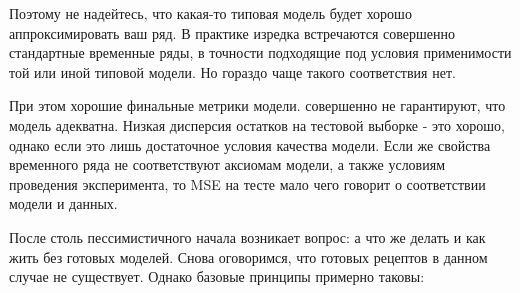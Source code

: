 Поэтому не надейтесь, что какая-то типовая модель будет хорошо
аппроксимировать ваш ряд. В практике изредка встречаются совершенно стандартные
временные ряды, в точности подходящие под условия применимости той
или иной типовой модели. Но гораздо чаще такого соответствия нет.

При этом хорошие финальные метрики модели. совершенно не гарантируют,
что модель адекватна. Низкая дисперсия остатков на тестовой выборке -
это хорошо, однако если это лишь достаточное условия качества модели.
Если же свойства временного ряда не соответствуют аксиомам модели, а
также условиям проведения эксперимента, то MSE на тесте мало чего
говорит о соответствии модели и данных.

После столь пессимистичного начала возникает вопрос: а что же делать
и как жить без готовых моделей. Снова оговоримся, что готовых рецептов в
данном случае не существует. Однако базовые принципы примерно таковы:

